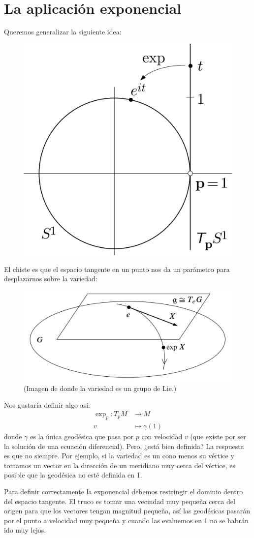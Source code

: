 \documentclass[spanish]{book}
\theoremstyle{definition}
\begin{document}
	\section{La aplicación exponencial}
	Queremos generalizar la siguiente idea:
	
	\begin{figure}[H]
		\centering
		\includegraphics[width=0.4\linewidth]{fig18}
	\end{figure}
	El chiste es que el espacio tangente en un punto nos da un parámetro para desplazarnos sobre la variedad:
	
	\begin{figure}[H]
		\centering
		\includegraphics[width=0.5\linewidth]{fig19}
		\caption*{(Imagen de \cite{Lee} donde la variedad es un grupo de Lie.)
		}
	\end{figure}
	Nos gustaría definir algo así:
	\begin{align*}
		\exp_p:T_pM&\to M\\
		v&\mapsto \gamma(1)
	\end{align*}
	donde $\gamma$ es la única geodésica que pasa por $p$ con velocidad $v$ (que existe por ser la solución de una ecuación diferencial). Pero, ¿está bien definida? La respuesta es que no siempre. Por ejemplo, si la variedad es un cono menos su vértice y tomamos un vector en la dirección de un meridiano muy cerca del vértice, es posible que la geodésica no esté definida en 1.
	
	Para definir correctamente la exponencial debemos restringir el dominio dentro del espacio tangente. El truco es tomar una vecindad muy pequeña cerca del origen para que los vectores tengan magnitud pequeña, así las geodésicas pasarán por el punto a velocidad muy pequeña y cuando las evaluemos en 1 no se habrán ido muy lejos.
	
\end{document}
